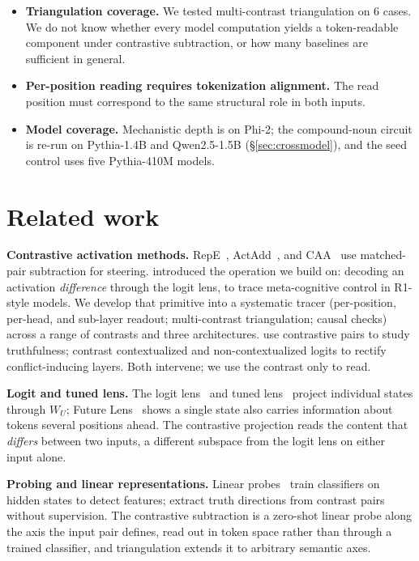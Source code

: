 \documentclass[11pt]{article}
\newcommand{\WU}{W_U}
\begin{document}
\begin{itemize}[leftmargin=*]
  tokens. Whether they form a coherent reading or token soup is a
  qualitative judgement. The visibility threshold
  \citep{tuomi2026visibility} bounds when an aligned component surfaces
  in the top-$K$, but provides no automatic coherence criterion.
\item \textbf{Triangulation coverage.} We tested multi-contrast triangulation on
  6 cases. We do not know whether every model computation yields a
  token-readable component under contrastive subtraction, or how many
  baselines are sufficient in general.
\item \textbf{Per-position reading requires tokenization alignment.} The read
  position must correspond to the same structural role in both inputs.
\item \textbf{Model coverage.} Mechanistic depth is on Phi-2; the
  compound-noun circuit is re-run on Pythia-1.4B and Qwen2.5-1.5B
  (\S\ref{sec:crossmodel}), and the seed control uses five Pythia-410M
  models.
\end{itemize}

\section{Related work}

\textbf{Contrastive activation methods.} RepE~\citep{zou2023},
ActAdd~\citep{turner2023}, and CAA~\citep{rimsky2024} use matched-pair
subtraction for steering. \citet{du2026} introduced the operation we build on:
decoding an activation \emph{difference} through the logit lens, to trace
meta-cognitive control in R1-style models. We develop that primitive into a
systematic tracer (per-position, per-head, and sub-layer readout; multi-contrast
triangulation; causal checks) across a range of contrasts and three
architectures. \citet{li2024} use contrastive pairs to study truthfulness;
\citet{ma2026} contrast contextualized and non-contextualized logits to rectify
conflict-inducing layers. Both intervene; we use the contrast only to read.

\textbf{Logit and tuned lens.} The logit lens~\citep{nostalgebraist2020} and
tuned lens~\citep{belrose2023} project individual states through $\WU$; Future
Lens~\citep{pal2023} shows a single state also carries information about tokens
several positions ahead. The contrastive projection reads the content that
\emph{differs} between two inputs, a different subspace from the logit lens on
either input alone.

\textbf{Probing and linear representations.} Linear probes~\citep{belinkov2022}
train classifiers on hidden states to detect features; \citet{burns2023} extract
truth directions from contrast pairs without supervision. The contrastive
subtraction is a zero-shot linear probe along the axis the input pair defines,
read out in token space rather than through a trained classifier, and
triangulation extends it to arbitrary semantic axes.
\end{document}
